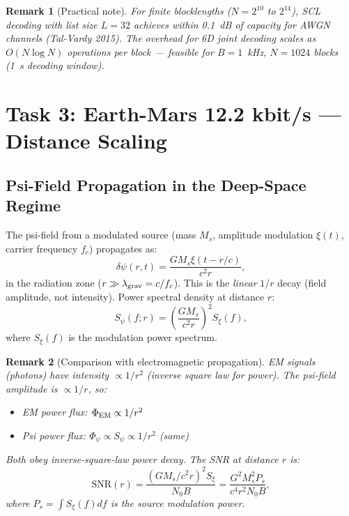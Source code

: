 \documentclass[aps,prd,twocolumn,superscriptaddress,nofootinbib]{revtex4-2}
\newcommand{\SNR}{\mathrm{SNR}}
\newtheorem{remark}{Remark}
\begin{document}
\begin{remark}[Practical note]
For finite blocklengths ($N = 2^{10}$ to $2^{14}$), SCL decoding with list
size $L = 32$ achieves within 0.1~dB of capacity for AWGN channels (Tal-Vardy
2015). The overhead for 6D joint decoding scales as $O(N \log N)$ operations
per block --- feasible for $B = 1$~kHz, $N = 1024$ blocks (1~s decoding window).
\end{remark}

\section{Task 3: Earth-Mars 12.2 kbit/s --- Distance Scaling}
\label{sec:deepspace}

\subsection{Psi-Field Propagation in the Deep-Space Regime}

The psi-field from a modulated source (mass $M_s$, amplitude modulation
$\xi(t)$, carrier frequency $f_c$) propagates as:
\begin{equation}
\delta\psi(r,t) = \frac{G M_s \xi(t - r/c)}{c^2 r},
\label{eq:psi-radial}
\end{equation}
in the radiation zone ($r \gg \lambda_{\rm grav} = c/f_c$). This is
the \emph{linear} $1/r$ decay (field amplitude, not intensity).
Power spectral density at distance $r$:
\begin{equation}
S_\psi(f; r) = \left(\frac{G M_s}{c^2 r}\right)^2 S_\xi(f),
\label{eq:Spsi-r}
\end{equation}
where $S_\xi(f)$ is the modulation power spectrum.

\begin{remark}[Comparison with electromagnetic propagation]
EM signals (photons) have intensity $\propto 1/r^2$ (inverse square law
for power). The psi-field amplitude is $\propto 1/r$, so:
\begin{itemize}
\item EM power flux: $\Phi_{\rm EM} \propto 1/r^2$
\item Psi power flux: $\Phi_\psi \propto S_\psi \propto 1/r^2$ (same)
\end{itemize}
Both obey inverse-square-law power decay. The SNR at distance $r$ is:
\begin{equation}
\SNR(r) = \frac{(G M_s / c^2 r)^2 S_\xi}{N_0 B}
= \frac{G^2 M_s^2 P_s}{c^4 r^2 N_0 B},
\label{eq:SNR-r}
\end{equation}
where $P_s = \int S_\xi(f) df$ is the source modulation power.
\end{remark}
\end{document}
